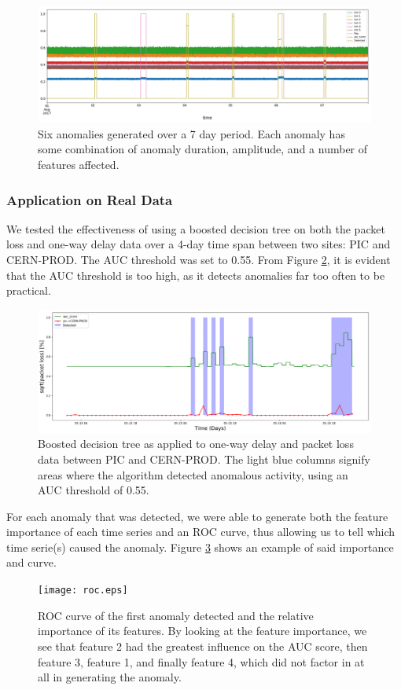 \documentclass[5p]{elsarticle}
\begin{document}
\begin{figure}[htbp]
    \centering
    \includegraphics[width=\linewidth]{withauc.png}
    \caption{Six anomalies generated over a 7 day period. Each anomaly has some combination of anomaly duration, amplitude, and a number of features affected.}
    \label{fig:withauc}
\end{figure}

\subsubsection{Application on Real Data}

We tested the effectiveness of using a boosted decision tree on both the packet loss and one-way delay data over a 4-day time span between two sites: PIC and CERN-PROD. The AUC threshold was set to 0.55. From Figure \ref{fig:BDTlow}, it is evident that the AUC threshold is too high, as it detects anomalies far too often to be practical.
\begin{figure}[htbp]
    \centering
    \includegraphics[width=1.0\linewidth]{BDT_lowcut.png}
    \caption{Boosted decision tree as applied to one-way delay and packet loss data between PIC and CERN-PROD. The light blue columns signify areas where the algorithm detected anomalous activity, using an AUC threshold of 0.55.}
    \label{fig:BDTlow}
\end{figure}

For each anomaly that was detected, we were able to generate both the feature importance of each time series and an ROC curve, thus allowing us to tell which time serie(s) caused the anomaly. Figure \ref{fig:roc} shows an example of said importance and curve. 
\begin{figure}[htbp]
    \centering
    \texttt{[image: roc.eps]}
    \caption{ROC curve of the first anomaly detected and the relative importance of its features. By looking at the feature importance, we see that feature 2 had the greatest influence on the AUC score, then feature 3, feature 1, and finally feature 4, which did not factor in at all in generating the anomaly.}
    \label{fig:roc}
\end{figure}
\end{document}
